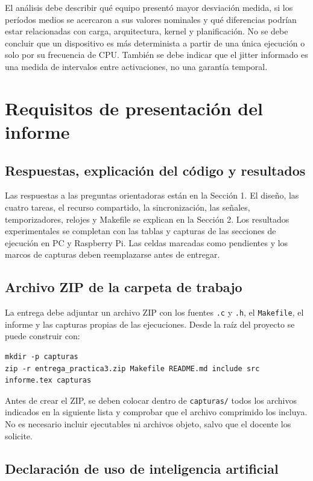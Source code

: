 \documentclass[12pt,a4paper]{article}
\begin{document}
El análisis debe describir qué equipo presentó mayor desviación medida, si los períodos medios se acercaron a sus valores nominales y qué diferencias podrían estar relacionadas con carga, arquitectura, kernel y planificación. No se debe concluir que un dispositivo es más determinista a partir de una única ejecución o solo por su frecuencia de CPU. También se debe indicar que el jitter informado es una medida de intervalos entre activaciones, no una garantía temporal.

\section{Requisitos de presentación del informe}

\subsection{Respuestas, explicación del código y resultados}

Las respuestas a las preguntas orientadoras están en la Sección 1. El diseño, las cuatro tareas, el recurso compartido, la sincronización, las señales, temporizadores, relojes y Makefile se explican en la Sección 2. Los resultados experimentales se completan con las tablas y capturas de las secciones de ejecución en PC y Raspberry Pi. Las celdas marcadas como pendientes y los marcos de capturas deben reemplazarse antes de entregar.

\subsection{Archivo ZIP de la carpeta de trabajo}

La entrega debe adjuntar un archivo ZIP con los fuentes \texttt{.c} y \texttt{.h}, el \texttt{Makefile}, el informe y las capturas propias de las ejecuciones. Desde la raíz del proyecto se puede construir con:
\begin{lstlisting}
mkdir -p capturas
zip -r entrega_practica3.zip Makefile README.md include src informe.tex capturas
\end{lstlisting}
Antes de crear el ZIP, se deben colocar dentro de \texttt{capturas/} todos los archivos indicados en la siguiente lista y comprobar que el archivo comprimido los incluya. No es necesario incluir ejecutables ni archivos objeto, salvo que el docente los solicite.

\subsection{Declaración de uso de inteligencia artificial}
\end{document}
